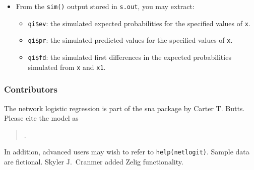 \begin{itemize}
\begin{itemize}
\end{itemize}
\item From the {\tt sim()} output stored in {\tt s.out}, you may extract:
\begin{itemize}
\item {\tt qi\$ev}: the simulated expected probabilities for the
specified values of {\tt x}.
\item {\tt qi\$pr}: the simulated predicted values for the specified values of {\tt x}.
\item {\tt qi\$fd}: the simulated first differences in the expected
probabilities simulated from {\tt x} and {\tt x1}.
\end{itemize}
\end{itemize}

\subsubsection{Contributors}
The network logistic regression is part of the sna package by Carter
T. Butts.  Please cite the model as \\
\begin{verse}
.
\end{verse}
In addition, advanced users may wish to refer to {\tt help(netlogit)}.
Sample data are fictional. Skyler J.\ Cranmer added Zelig functionality. 
